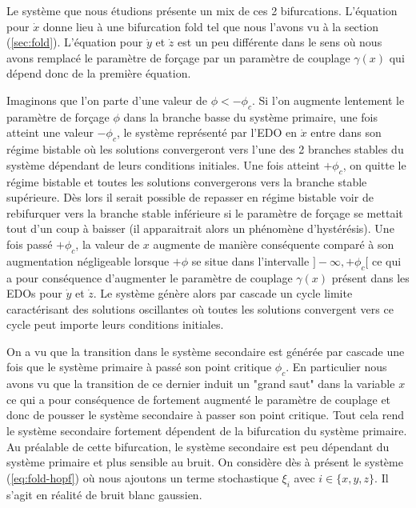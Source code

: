 Le système que nous étudions présente un mix de ces 2 bifurcations. L'équation pour $\dot{x}$ donne lieu à une bifurcation fold tel que nous l'avons vu à la section (\ref{sec:fold}). L'équation pour $\dot{y}$ et $\dot{z}$ est un peu différente dans le sens où nous avons remplacé le paramètre de forçage par un paramètre de couplage $\gamma(x)$ qui dépend donc de la première équation.


Imaginons que l’on parte d’une valeur de $\phi < - \phi_c$. Si l’on augmente lentement le paramètre de forçage $\phi$ dans la branche basse du système primaire, une fois atteint une valeur $-\phi_c$, le système représenté par l’EDO en $\dot{x}$ entre dans son régime bistable où les solutions convergeront vers l’une des 2 branches stables du système dépendant de leurs conditions initiales. Une fois atteint $+\phi_c$, on quitte le régime bistable et toutes les solutions convergerons vers la branche stable supérieure. Dès lors il serait possible de repasser en régime bistable voir de rebifurquer vers la branche stable inférieure si le paramètre de forçage se mettait tout d’un coup à baisser (il apparaitrait alors un phénomène d’hystérésis). Une fois passé $+\phi_c$, la valeur de $x$ augmente de manière conséquente comparé à son augmentation négligeable lorsque $+\phi$ se situe dans l’intervalle $]-\infty, +\phi_c[$ ce qui a pour conséquence d’augmenter le paramètre de couplage $\gamma(x)$ présent dans les EDOs pour $\dot{y}$ et $\dot{z}$.  Le système génère alors par cascade un cycle limite caractérisant des solutions oscillantes où toutes les solutions convergent vers ce cycle peut importe leurs conditions initiales.



On a vu que la transition dans le système secondaire est générée par cascade une fois que le système primaire à passé son point critique $\phi_c$. En particulier nous avons vu que la transition de ce dernier induit un "grand saut" dans la variable $x$ ce qui a pour conséquence de fortement augmenté le paramètre de couplage et donc de pousser le système secondaire à passer son point critique. Tout cela rend le système secondaire fortement dépendent de la bifurcation du système primaire. Au préalable de cette bifurcation, le système secondaire est peu dépendant du système primaire et plus sensible au bruit.
On considère dès à présent le système (\ref{eq:fold-hopf}) où nous ajoutons un terme stochastique $\xi_i$ avec $i \in \{x, y, z\}$. Il s'agit en réalité de bruit blanc gaussien.

